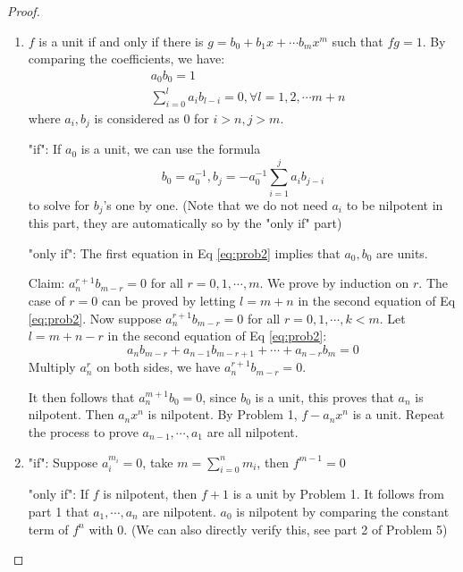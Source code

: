 \documentclass{solution}
\begin{document}
\begin{proof}
    \begin{enumerate}
        \item $f$ is a unit if and only if there is $g = b_0 + b_1 x + \cdots b_mx^m$ such that $fg = 1$. By comparing the coefficients, we have:
        \begin{equation}\label{eq:prob2}
            \begin{aligned}
            &a_0b_0 = 1 \\
            &\sum\limits_{i = 0}^{l} a_i b_{l - i} = 0, \forall l = 1, 2, \cdots m + n
            \end{aligned}
        \end{equation}
        where $a_i, b_j$ is considered as $0$ for $i \gt n, j \gt m$.

        "if": If $a_0$ is a unit, we can use the formula
        $$b_0 = a_0 ^{-1}, b_j = - a_0 ^{-1} \sum\limits_{i = 1}^{j} a_i b_{j - i}$$
        to solve for $b_j$'s one by one. (Note that we do not need $a_i$ to be nilpotent in this part, they are automatically so by the "only if" part)

        "only if": The first equation in Eq \ref{eq:prob2} implies that $a_0, b_0$ are units.
        
        Claim: $a_n^{r + 1} b_{m - r} = 0$ for all $r = 0, 1, \cdots, m$. We prove by induction on $r$. The case of $r = 0$ can be proved by letting $l = m + n$ in the second equation of Eq \ref{eq:prob2}. Now suppose $a_n^{r + 1} b_{m - r} = 0$ for all $r = 0, 1, \cdots, k \lt m$. Let $l = m + n - r$ in the second equation of Eq \ref{eq:prob2}:
        $$a_nb_{m - r} + a_{n - 1}b_{m - r + 1} + \cdots + a_{n - r} b_{m} = 0$$
        Multiply $a_n^{r}$ on both sides, we have $a_n^{r + 1} b_{m - r} = 0$.

        It then follows that $a_n^{m + 1} b_0 = 0$, since $b_0$ is a unit, this proves that $a_n$ is nilpotent. Then $a_nx^n$ is nilpotent. By Problem 1, $f - a_nx^n$ is a unit. Repeat the process to prove $a_{n - 1}, \cdots, a_1$ are all nilpotent.

        \item "if": Suppose $a_i^{m_i} = 0$, take $m = \sum\limits_{i = 0}^{n} m_i$, then $f^{m - 1} = 0$

        "only if": If $f$ is nilpotent, then $f + 1$ is a unit by Problem 1. It follows from part 1 that $a_1, \cdots, a_n$ are nilpotent. $a_0$ is nilpotent by comparing the constant term of $f^n$ with $0$. (We can also directly verify this, see part 2 of Problem 5)


\end{enumerate}
\end{proof}
\end{document}
